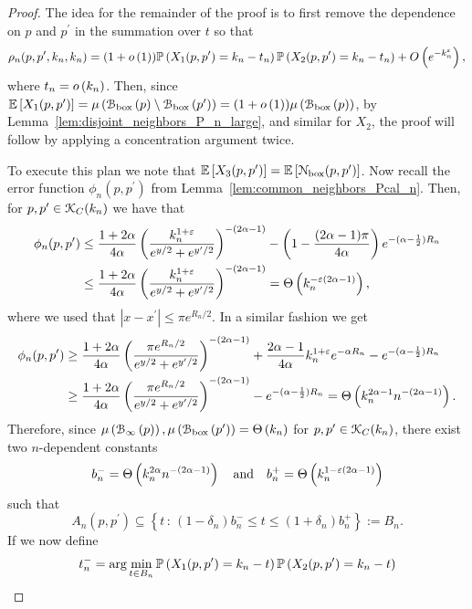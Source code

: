 \begin{proof}
The idea for the remainder of the proof is to first remove the dependence on $p$ and $p^\prime$ in the summation over $t$ so that
\[
	\rho_{n}(p,p^\prime,k_n,k_n) = (1 + o\left(1\right))\mathbb{P}\left(X_1(p,p^\prime) = k_n - t_n\right)
			\mathbb{P}\left(X_2(p,p^\prime) = k_n - t_n\right)
	+ O\left(e^{-k_n^\varepsilon}\right),
\]
where $t_n = o\left(k_n\right)$. Then, since $\mathbb{E}\left[X_1(p,p^\prime)\right] = \mu\left({\mathcal B}_{\text{box}}\left(p\right)\setminus {\mathcal B}_{\text{box}}\left(p^\prime\right)\right) = 
(1 + o\left(1\right))\mu\left({\mathcal B}_{\text{box}}\left(p\right)\right)$, by Lemma~\ref{lem:disjoint_neighbors_P_n_large}, and similar for $X_2$, the proof will follow by applying a concentration argument twice.

To execute this plan we note that $\mathbb{E}\left[X_3(p,p^\prime)\right] = \mathbb{E}\left[{\mathcal N}_{\text{box}}(p,p^\prime)\right]$. Now recall the error function $\phi_n(p,p^\prime)$ from Lemma~\ref{lem:common_neighbors_Pcal_n}. Then, for $p,p^\prime \in {\mathcal K}_{C}(k_n)$ we have that
\begin{align*}
	\phi_n(p,p^\prime) 
	&\le \frac{1 + 2\alpha}{4\alpha}\left(\frac{k_n^{1 + \varepsilon}}{e^{y/2} + e^{y^\prime/2}}\right)^{-(2\alpha - 1)} 
	- \left(1-\frac{(2\alpha - 1)\pi}{4\alpha}\right)e^{-(\alpha - \frac{1}{2})R_n}\\
	&\le \frac{1 + 2\alpha}{4\alpha}\left(\frac{k_n^{1 + \varepsilon}}{e^{y/2} + e^{y^\prime/2}}\right)^{-(2\alpha - 1)}
		=\Theta\left(k_n^{-\varepsilon(2\alpha - 1)}\right),
\end{align*}
where we used that $|x - x^\prime| \le \pi e^{R_n/2}$. In a similar fashion we get
\begin{align*}
	\phi_n(p,p^\prime) 
	&\ge \frac{1 + 2\alpha}{4\alpha}\left(\frac{\pi e^{R_n/2}}{e^{y/2} + e^{y^\prime/2}}\right)^{-(2\alpha - 1)}
		+ \frac{2\alpha - 1}{4\alpha} k_n^{1 + \varepsilon}e^{-\alpha R_n} - e^{-(\alpha - \frac{1}{2})R_n}\\
	&\ge \frac{1 + 2\alpha}{4\alpha}\left(\frac{\pi e^{R_n/2}}{e^{y/2} + e^{y^\prime/2}}\right)^{-(2\alpha - 1)}
		- e^{-(\alpha - \frac{1}{2})R_n} = \Theta\left(k_n^{2\alpha - 1}n^{-(2\alpha - 1)}\right).
\end{align*}
Therefore, since $\mu\left({\mathcal B}_{\infty}\left(p\right)\right), \mu\left({\mathcal B}_{\text{box}}\left(p^\prime\right)\right) = \Theta\left(k_n\right)$ for $p,p^\prime \in {\mathcal K}_{C}(k_n)$, there exist two $n$-dependent constants 
\[
	b_n^- = \Theta\left(k_n^{2\alpha} n^{-(2\alpha - 1)}\right) \quad \text{and} \quad
	b_n^+ = \Theta\left(k_n^{1 - \varepsilon(2\alpha - 1)}\right)
\]
such that
\[
	A_n(p,p^\prime) \subseteq \left\{t \, : \, (1-\delta_n)b_n^- \le t \le (1+\delta_n)b_n^+ \right\} := B_n.
\]
If we now define
\begin{align*}
	t_n^- &= \arg \min_{t \in B_n} \Prob{X_1(p,p^\prime) = k_n - t}\Prob{X_2(p,p^\prime) = k_n - t}\\

\end{align*}
\end{proof}
